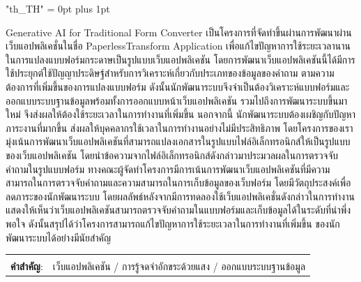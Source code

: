 \documentclass[12pt,oneside,openright,a4paper]{cpe-english-project}
\begin{document}
{
\XeTeXlinebreaklocale "th_TH"	
\XeTeXlinebreakskip = 0pt plus 1pt
\thaifont
\thaiabstract

Generative AI for Traditional Form Converter เป็นโครงการที่จัดทำขึ้นผ่านการพัฒนาผ่านเว็บแอปพลิเคชั่นในชื่อ PaperlessTransform Application
เพื่อแก้ไขปัญหาการใช้ระยะเวลานานในการแปลงแบบฟอร์มกระดาษเป็นรูปแบบเว็บแอปพลิเคชัน โดยการพัฒนาเว็บแอปพลิเคชันนี้ได้มีการใช้ประยุกต์ใช้ปัญญาประดิษฐ์สำหรับการวิเคราะห์เกี่ยวกับประเภทของข้อมูลของคำถาม 
ตามความต้องการที่เพิ่มขึ้นของการแปลงแบบฟอร์ม ดังนั้นนักพัฒนาระบบจึงจำเป็นต้องวิเคราะห์แบบฟอร์มและออกแบบระบบฐานข้อมูลพร้อมทั้งการออกแบบหน้าเว็บแอปพลิเคชัน รวมไปถึงการพัฒนาระบบขึ้นมาใหม่
จึงส่งผลให้ต้องใช้ระยะเวลาในการทำงานที่เพิ่มขึ้น นอกจากนี้ นักพัฒนาระบบต้องเผชิญกับปัญหาภาระงานที่มากขึ้น ส่งผลให้บุคคลากรใช้เวลาในการทำงานอย่างไม่มีประสิทธิภาพ 
โดยโครงการของเรามุ่งเน้นการพัฒนาเว็บแอปพลิเคชันที่สามารถแปลงเอกสารในรูปแบบไฟล์อิเล็กทรอนิกส์ให้เป็นรูปแบบของเว็บแอปพลิเคชัน 
โดยนำข้อความจากไฟล์อิเล็กทรอนิกส์ดังกล่าวมาประมวลผลในการตรวจจับคำถามในรูปแบบฟอร์ม 
ทางคณะผู้จัดทำโครงการมีการเน้นการพัฒนาเว็บแอปพลิเคชันที่มีความสามารถในการตรวจจับคำถามและความสามารถในการเก็บข้อมูลของเว็บฟอร์ม 
โดยมีวัตถุประสงค์เพื่อลดภาระของนักพัฒนาระบบ โดยผลลัพธ์หลังจากมีการทดลองใช้เว็บแอปพลิเคชั่นดังกล่าวในการทำงานแสดงให้เห็นว่าเว็บแอปพลิเคชันสามารถตรวจจับคำถามในแบบฟอร์มและเก็บข้อมูลได้ในระดับที่น่าพึ่งพอใจ ดังนั้นสรุปได้ว่าโครงการสามารถแก้ไขปัญหาการใช้ระยะเวลาในการทำงานที่เพิ่มขึ้น ของนักพัฒนาระบบได้อย่างมีนัยสำคัญ

\begin{flushleft}
\begin{tabular*}{\textwidth}{@{}lp{}}
 & \\

\textbf{คำสำคัญ}: & เว็บแอปพลิเคชัน / การรู้จดจำอักขระด้วยแสง /  ออกแบบระบบฐานข้อมูล
\end{tabular*}
\end{flushleft}
\endabstract
}
\end{document}
